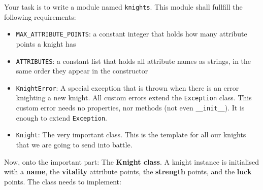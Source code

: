 \noindent Your task is to write a module named \texttt{knights}. This module shall fullfill
the following requirements:
\begin{itemize}
	\item \texttt{MAX\_ATTRIBUTE\_POINTS}: a constant integer that holds how many
		attribute points a knight has
	\item \texttt{ATTRIBUTES}: a constant list that holds all attribute names
		as strings, in the same order they appear in the constructor
	\item \texttt{KnightError}: A special exception that is thrown when there is
		an error knighting a new knight. All custom errors extend the 
		\texttt{Exception} class. This custom error needs no properties, nor
		methods (not even \texttt{\_\_init\_\_}). It is enough to extend \texttt{Exception}.
	\item \texttt{Knight}: The very important class. This is the template for all our
		knights that we are going to send into battle.
\end{itemize}
Now, onto the important part: The \textbf{Knight class}. A knight instance is initialised with
a \textbf{name}, the \textbf{vitality} attribute points, the \textbf{strength} points, and the
\textbf{luck} points. The class needs to implement:
